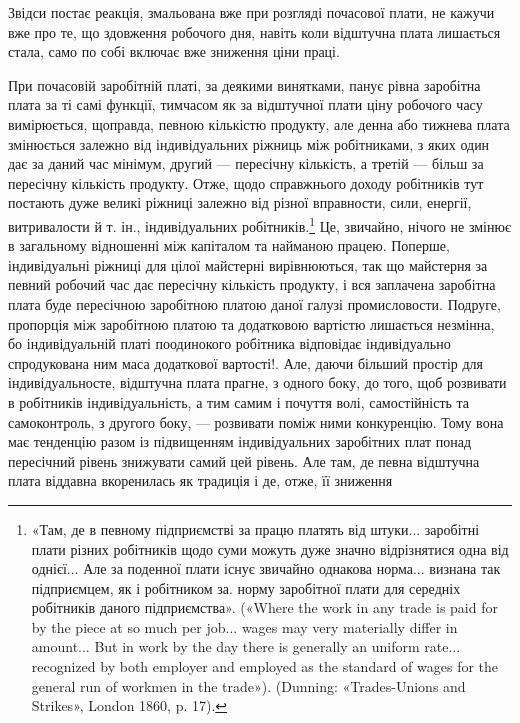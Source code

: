 \parcont{}  %
Звідси постає реакція, змальована вже при розгляді почасової
плати, не кажучи вже про те, що здовження робочого дня, навіть
коли відштучна плата лишається стала, само по собі включає
вже зниження ціни праці.

При почасовій заробітній платі, за деякими винятками, панує
рівна заробітна плата за ті самі функції, тимчасом як за відштучної
плати ціну робочого часу вимірюється, щоправда, певною
кількістю продукту, але денна або тижнева плата змінюється
залежно від індивідуальних ріжниць між робітниками, з яких
один дає за даний час мінімум, другий — пересічну кількість,
а третій — більш за пересічну кількість продукту. Отже, щодо
справжнього доходу робітників тут постають дуже великі ріжниці
залежно від різної вправности, сили, енергії, витривалости
й т. ін., індивідуальних робітників.\footnote{
«Там, де в певному підприємстві за працю платять від штуки...
заробітні плати різних робітників щодо суми можуть дуже значно відрізнятися
одна від однієї... Але за поденної плати існує звичайно однакова
норма... визнана так підприємцем, як і робітником за. норму заробітної
плати для середніх робітників даного підприємства». («Where the
work in any trade is paid for by the piece at so much per job... wages may
very materially differ in amount... But in work by the day there is generally
an uniform rate... recognized by both employer and employed as the
standard of wages for the general run of workmen in the trade»). (Dunning:
«Trades-Unions and Strikes», London 1860, p. 17).
} Це, звичайно, нічого не
змінює в загальному відношенні між капіталом та найманою
працею. Поперше, індивідуальні ріжниці для цілої майстерні
вирівнюються, так що майстерня за певний робочий час дає пересічну
кількість продукту, і вся заплачена заробітна плата буде
пересічною заробітною платою даної галузі промисловости. Подруге,
пропорція між заробітною платою та додатковою вартістю
лишається незмінна, бо індивідуальній платі поодинокого робітника
відповідає індивідуально спродукована ним маса додаткової
вартості!. Але, даючи більший простір для індивідуальносте,
відштучна плата прагне, з одного боку, до того, щоб розвивати в
робітників індивідуальність, а тим самим і почуття волі, самостійність
та самоконтроль, з другого боку, — розвивати поміж
ними конкуренцію. Тому вона має тенденцію разом із підвищенням
індивідуальних заробітних плат понад пересічний рівень
знижувати самий цей рівень. Але там, де певна відштучна
плата віддавна вкоренилась як традиція і де, отже, її зниження
